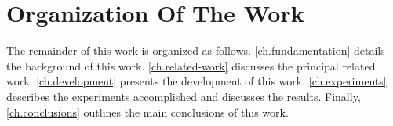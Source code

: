 
\section{Organization Of The Work}
\label{sec.organization}
	
	The remainder of this work is organized as follows.
	\autoref{ch.fundamentation} details the background of this work.
	\autoref{ch.related-work} discusses the principal related work.
	\autoref{ch.development} presents the development of this work.
	\autoref{ch.experiments} describes the experiments accomplished and
	discusses the results.  Finally, \autoref{ch.conclusions} outlines
	the main conclusions of this work.
